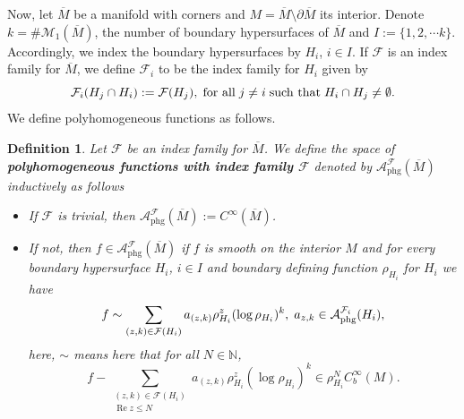 \documentclass[a4paper,11pt]{article}
\newcounter{mythm}[section]
\newtheorem{defi}[mythm]{Definition}
\begin{document}
Now, let $\overline{M}$ be a manifold with corners and $M = \overline{M} \setminus \partial \overline{M}$ its interior. Denote $k = \# \mathcal{M}_1(\overline{M})$, the number of boundary hypersurfaces of $\overline{M}$ and $I := \{1,2, \cdots k \}$. Accordingly, we index the boundary hypersurfaces by $H_i$, $i \in I$. If $\mathcal{F}$ is an index family for $\overline{M}$, we define $\mathcal{F}_i$ to be the index family for $H_i$ given by 
$$
\mathcal{F}_i(H_j \cap H_i) := \mathcal{F}(H_j), \hspace{0.1cm}  \text{for all} \hspace{0.1cm} j \neq i \hspace{0.1cm} \text{such that} \hspace{0.1cm} H_i \cap H_j \neq \emptyset.
$$
We define polyhomogeneous functions as follows.
\begin{defi}
Let $\mathcal{F}$ be an index family for $\overline{M}$. We define the space of \textbf{polyhomogeneous functions with index family $\mathcal{F}$} denoted by $\mathcal{A}_{\text{phg}}^{\mathcal{F}}(\overline{M})$ inductively as follows 
    \begin{itemize}
        \item If $\mathcal{F}$ is trivial, then $\mathcal{A}_{\text{phg}}^{\mathcal{F}}(\overline{M}) := C^\infty (\overline{M})$.
\item If not, then $f \in \mathcal{A}_{\text{phg}}^{\mathcal{F}}(\overline{M})$ if $f$ is smooth on the interior $M$ and for every boundary hypersurface $H_i$, $i \in I$ and boundary defining function $\rho_{H_i}$ for $H_i$ we have
$$
 f \sim \sum_{(z, k) \in \mathcal{F}(H_i)} a_{(z, k)} \rho_{H_i}^z(\log \rho_{H_i})^k, \hspace{0.1cm} a_{z, k} \in \mathcal{A}_{\text{phg}}^{\mathcal{F}_i}(H_i),
$$
here, $\sim$ means here that for all $N \in \mathbb{N}$,
$$
 f-\sum_{\substack{(z, k) \in \mathcal{F}(H_i) \\ \operatorname{Re} z \leq N}} a_{(z, k)} \rho_{H_i}^z(\log \rho_{H_i})^k \in \rho_{H_i}^N C_b^{\infty}(M).
$$
        
    \end{itemize}
\end{defi}
\end{document}
